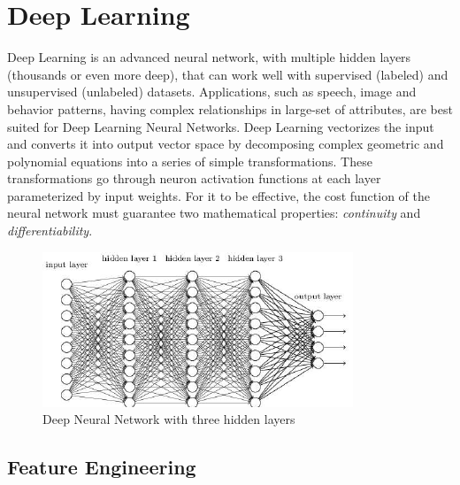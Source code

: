 \documentclass[sigconf]{acmart}
\begin{document}
	\section{Deep Learning}
	
	Deep Learning is an advanced neural network, with multiple hidden layers (thousands or even more deep), that can work well with supervised (labeled) and unsupervised (unlabeled) datasets. Applications, such as speech, image and behavior patterns, having complex relationships in large-set of attributes, are best suited for Deep Learning Neural Networks. Deep Learning vectorizes the input and converts it into output vector space by decomposing complex geometric and polynomial equations into a series of simple transformations. These transformations go through neuron activation functions at each layer parameterized by input weights. For it to be effective, the cost function of the neural network must guarantee two mathematical properties: {\em continuity} and {\em differentiability}.
	
	\begin{figure}
		\centering
		\includegraphics[width=1.0\columnwidth]{images/deepnetwork}
		\caption{Deep Neural Network with three hidden layers \cite{Goodfellow2016}} \label{fig:figure2} 
	\end{figure}

	\subsection{Feature Engineering}
	
\end{document}
